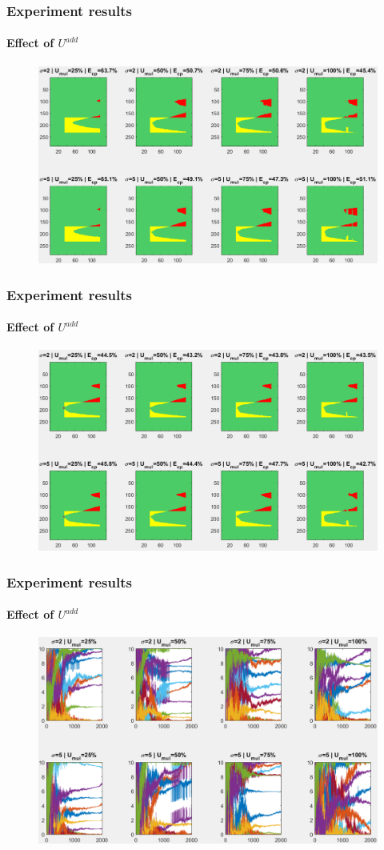 \documentclass[fleqn]{beamer}
\begin{document}
\begin{frame}
	\frametitle{Experiment results}
	\framesubtitle{Effect of $U^{add}$}
	\begin{figure}
		\centering
		\includegraphics[width=4.5in]{figures/results_figures/Uadd/cp_Uadd_5_lambda_11.png}
	\end{figure}
\end{frame}

\begin{frame}
	\frametitle{Experiment results}
	\framesubtitle{Effect of $U^{add}$}
	\begin{figure}
		\centering
		\includegraphics[width=4.5in]{figures/results_figures/Uadd/cp_Uadd_10_lambda_11.png}
	\end{figure}
\end{frame}

\begin{frame}
	\frametitle{Experiment results}
	\framesubtitle{Effect of $U^{add}$}
	\begin{figure}
		\centering
		\includegraphics[width=4.5in]{figures/results_figures/Uadd/knobs_Uadd_25_lambda_11.png}
	\end{figure}
\end{frame}
\end{document}

